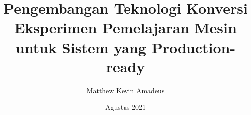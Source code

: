 \title{Pengembangan Teknologi Konversi Eksperimen Pemelajaran Mesin untuk Sistem yang Production-ready}
\date{Agustus 2021}

\newcommand{\nim}{13518035}
\author{Matthew Kevin Amadeus}

\newcommand{\supervisor}{Achmad Imam Kistiantoro, S.T, M.Sc., Ph.D.}
\newcommand{\supervisornip}{19730809 200604 1 001}
\newcommand{\dean}{Dessi Puji Lestari, S.T, M.Eng., Ph.D.}
